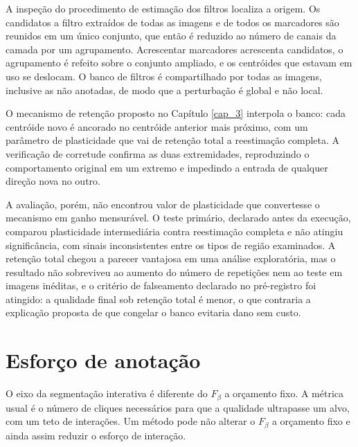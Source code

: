 A inspeção do procedimento de estimação dos filtros localiza a origem. Os candidatos a filtro extraídos de todas as imagens e de todos os marcadores são reunidos em um único conjunto, que então é reduzido ao número de canais da camada por um agrupamento. Acrescentar marcadores acrescenta candidatos, o agrupamento é refeito sobre o conjunto ampliado, e os centróides que estavam em uso se deslocam. O banco de filtros é compartilhado por todas as imagens, inclusive as não anotadas, de modo que a perturbação é global e não local.

O mecanismo de retenção proposto no Capítulo \ref{cap_3} interpola o banco: cada centróide novo é ancorado no centróide anterior mais próximo, com um parâmetro de plasticidade que vai de retenção total a reestimação completa. A verificação de corretude confirma as duas extremidades, reproduzindo o comportamento original em um extremo e impedindo a entrada de qualquer direção nova no outro.

A avaliação, porém, não encontrou valor de plasticidade que convertesse o mecanismo em ganho mensurável. O teste primário, declarado antes da execução, comparou plasticidade intermediária contra reestimação completa e não atingiu significância, com sinais inconsistentes entre os tipos de região examinados. A retenção total chegou a parecer vantajosa em uma análise exploratória, mas o resultado não sobreviveu ao aumento do número de repetições nem ao teste em imagens inéditas, e o critério de falseamento declarado no pré-registro foi atingido: a qualidade final sob retenção total é menor, o que contraria a explicação proposta de que congelar o banco evitaria dano sem custo.

\section{Esforço de anotação}

O eixo da segmentação interativa é diferente do $F_\beta$ a orçamento fixo. A métrica usual é o número de cliques necessários para que a qualidade ultrapasse um alvo, com um teto de interações. Um método pode não alterar o $F_\beta$ a orçamento fixo e ainda assim reduzir o esforço de interação.

\begin{table}[htb]
\centering
\caption{Cliques até a qualidade alvo, por plasticidade do banco de filtros.}
\label{tab_noc}

\end{table}



